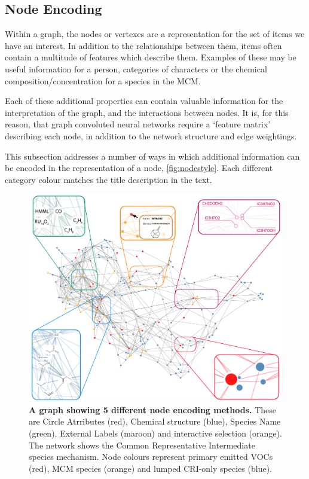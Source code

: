 \subsection{Node Encoding}
Within a graph, the nodes or vertexes are a representation for the set of items we have an interest. In addition to the relationships between them, items often contain a multitude of features which describe them. Examples of these may be useful information for a person, categories of characters or the chemical composition/concentration for a species in the MCM.

Each of these additional properties can contain valuable information for the interpretation of the graph, and the interactions between nodes. It is, for this reason, that graph convoluted neural networks \citep{t2gcn} require a  `feature matrix' describing each node, in addition to the network structure and edge weightings. 

This subsection addresses a number of ways in which additional information can be encoded in the representation of a node, \autoref{fig:nodestyle}. Each different category colour matches the title description in the text. 


\begin{figure}[H]
     \centering
     \includegraphics[width=\textwidth]{figures_c1/NODES_001f3d-00775b-ff9000-f71735-c10053.pdf}
        \caption{\textbf{A graph showing 5 different node encoding methods.} These are Circle Atrributes (red), Chemical structure (blue), Species Name (green), External Labels (maroon) and interactive selection (orange). The network shows the Common Representative Intermediate species \citep{cri} mechanism. Node colours represent primary emitted VOCs (red), MCM species (orange) and lumped CRI-only species (blue).  }
      \label{fig:nodestyle}
\end{figure}






